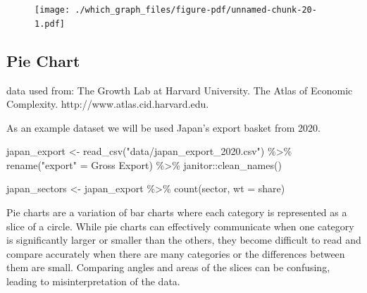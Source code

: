 \documentclass[
  letterpaper,
]{book}
\newenvironment{Shaded}{\begin{snugshade}}{\end{snugshade}}
\newcommand{\AttributeTok}[1]{\textcolor[rgb]{0.40,0.45,0.13}{#1}}
\newcommand{\FunctionTok}[1]{\textcolor[rgb]{0.28,0.35,0.67}{#1}}
\newcommand{\NormalTok}[1]{\textcolor[rgb]{0.00,0.23,0.31}{#1}}
\newcommand{\OtherTok}[1]{\textcolor[rgb]{0.00,0.23,0.31}{#1}}
\newcommand{\SpecialCharTok}[1]{\textcolor[rgb]{0.37,0.37,0.37}{#1}}
\newcommand{\StringTok}[1]{\textcolor[rgb]{0.13,0.47,0.30}{#1}}
\begin{document}
\begin{figure}[H]

{\centering \texttt{[image: ./which\_graph\_files/figure-pdf/unnamed-chunk-20-1.pdf]}

}

\end{figure}

\hypertarget{pie-chart}{%
\subsection{Pie Chart}\label{pie-chart}}

data used from: The Growth Lab at Harvard University. The Atlas of
Economic Complexity. http://www.atlas.cid.harvard.edu.

As an example dataset we will be used Japan's export basket from 2020.

\begin{Shaded}
\begin{Highlighting}[]
\NormalTok{japan\_export }\OtherTok{\textless{}{-}} \FunctionTok{read\_csv}\NormalTok{(}\StringTok{"data/japan\_export\_2020.csv"}\NormalTok{) }\SpecialCharTok{\%\textgreater{}\%} \FunctionTok{rename}\NormalTok{(}\StringTok{"export"} \OtherTok{=} \StringTok{\textasciigrave{}}\AttributeTok{Gross Export}\StringTok{\textasciigrave{}}\NormalTok{) }\SpecialCharTok{\%\textgreater{}\%}\NormalTok{ janitor}\SpecialCharTok{::}\FunctionTok{clean\_names}\NormalTok{()}

\NormalTok{japan\_sectors }\OtherTok{\textless{}{-}}\NormalTok{ japan\_export }\SpecialCharTok{\%\textgreater{}\%} \FunctionTok{count}\NormalTok{(sector, }\AttributeTok{wt =}\NormalTok{ share) }
\end{Highlighting}
\end{Shaded}

Pie charts are a variation of bar charts where each category is
represented as a slice of a circle. While pie charts can effectively
communicate when one category is significantly larger or smaller than
the others, they become difficult to read and compare accurately when
there are many categories or the differences between them are small.
Comparing angles and areas of the slices can be confusing, leading to
misinterpretation of the data.
\end{document}
